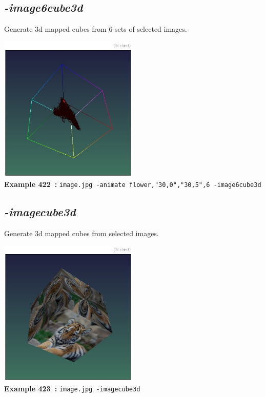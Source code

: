\documentclass[a4paper,11pt,twoside]{book}
\begin{document}
\subsection{\emph{-image6cube3d} }\vspace*{-0.5em}
Generate 3d mapped cubes from 6-sets of selected images.
\begin{center}\includegraphics[keepaspectratio=true,height=7cm,width=\textwidth]{img/gmic_def422.jpg}\\
{\footnotesize \textbf{Example 422~:} \texttt{image.jpg -animate flower,"30,0","30,5",6 -image6cube3d}}
\end{center}

\subsection{\emph{-imagecube3d} }\vspace*{-0.5em}
Generate 3d mapped cubes from selected images.
\begin{center}\includegraphics[keepaspectratio=true,height=7cm,width=\textwidth]{img/gmic_def423.jpg}\\
{\footnotesize \textbf{Example 423~:} \texttt{image.jpg -imagecube3d}}
\end{center}
\end{document}
